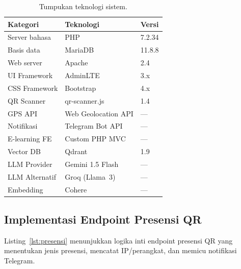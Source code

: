 \documentclass[12pt,a4paper]{article}
\begin{document}
\begin{table}[htbp]
\centering
\caption{Tumpukan teknologi sistem.}
\label{tab:stack}
\small
\renewcommand{\arraystretch}{1.15}
\begin{tabular}{lll}
\toprule
\textbf{Kategori} & \textbf{Teknologi} & \textbf{Versi} \\
\midrule
Server bahasa      & PHP               & 7.2.34 \\
Basis data         & MariaDB           & 11.8.8 \\
Web server         & Apache            & 2.4 \\
UI Framework       & AdminLTE          & 3.x \\
CSS Framework      & Bootstrap         & 4.x \\
QR Scanner         & qr-scanner.js     & 1.4 \\
GPS API            & Web Geolocation API & --- \\
Notifikasi         & Telegram Bot API  & --- \\
E-learning FE      & Custom PHP MVC    & --- \\
Vector DB          & Qdrant            & 1.9 \\
LLM Provider       & Gemini 1.5 Flash  & --- \\
LLM Alternatif     & Groq (Llama~3)    & --- \\
Embedding          & Cohere            & --- \\
\bottomrule
\end{tabular}
\end{table}

\subsection{Implementasi Endpoint Presensi QR}

Listing~\ref{lst:presensi} menunjukkan logika inti endpoint presensi
QR yang menentukan jenis presensi, mencatat IP/perangkat, dan
memicu notifikasi Telegram.
\end{document}
